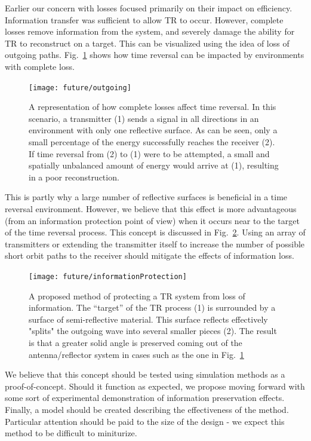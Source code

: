 Earlier our concern with losses focused primarily on their impact on efficiency. Information transfer was sufficient to allow TR to occur. However, complete losses remove information from the system, and severely damage the ability for TR to reconstruct on a target. This can be visualized using the idea of loss of outgoing paths. Fig.~\ref{fig:outgo} shows how time reversal can be impacted by environments with complete loss.

\begin{figure}[h]
\texttt{[image: future/outgoing]}
\caption[Example of information loss on time reversal efficacy]{A representation of how complete losses affect time reversal. In this scenario, a transmitter (1) sends a signal in all directions in an environment with only one reflective surface. As can be seen, only a small percentage of the energy successfully reaches the receiver (2). If time reversal from (2) to (1) were to be attempted, a small and spatially unbalanced amount of energy would arrive at (1), resulting in a poor reconstruction.}
\label{fig:outgo}
\end{figure}

This is partly why a large number of reflective surfaces is beneficial in a time reversal environment. However, we believe that this effect is more advantageous (from an information protection point of view) when it occurs near to the target of the time reversal process. This concept is discussed in Fig.~\ref{fig:infoProtection}. Using an array of transmitters or extending the transmitter itself to increase the number of possible short orbit paths to the receiver should mitigate the effects of information loss.

\begin{figure}[h]
\texttt{[image: future/informationProtection]}
\caption[Proposed TR information protection system]{A proposed method of protecting a TR system from loss of information. The ``target'' of the TR process (1) is surrounded by a surface of semi-reflective material. This surface reflects effectively "splits" the outgoing wave into several smaller pieces (2). The result is that a greater solid angle is preserved coming out of the antenna/reflector system in cases such as the one in Fig.~\ref{fig:outgo}}
\label{fig:infoProtection}
\end{figure}

We believe that this concept should be tested using simulation methods as a proof-of-concept. Should it function as expected, we propose moving forward with some sort of experimental demonstration of information preservation effects. Finally, a model should be created describing the effectiveness of the method. Particular attention should be paid to the size of the design - we expect this method to be difficult to miniturize.
